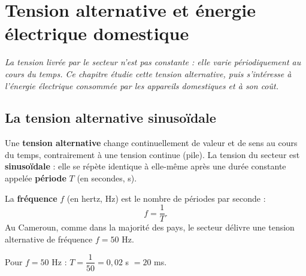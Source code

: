 \chapter{Tension alternative et énergie électrique domestique}

\noindent\textit{La tension livrée par le secteur n'est pas constante : elle varie
périodiquement au cours du temps. Ce chapitre étudie cette tension alternative, puis
s'intéresse à l'énergie électrique consommée par les appareils domestiques et à son coût.}
\vspace{8pt}

\connecteBanner

\section{La tension alternative sinusoïdale}

\begin{definition}
Une \textbf{tension alternative} change continuellement de valeur et de sens au cours du
temps, contrairement à une tension continue (pile). La tension du secteur est
\textbf{sinusoïdale} : elle se répète identique à elle-même après une durée constante
appelée \textbf{période} $T$ (en secondes, s).
\end{definition}

\begin{illus}
\end{illus}

\begin{propriete}[Fréquence]
La \textbf{fréquence} $f$ (en hertz, Hz) est le nombre de périodes par seconde :
\[
f=\frac1T.
\]
Au Cameroun, comme dans la majorité des pays, le secteur délivre une tension alternative
de fréquence $f=50$ Hz.
\end{propriete}

\begin{exemple}
Pour $f=50$ Hz : $T=\dfrac1{50}=0{,}02$ s $=20$ ms.
\end{exemple}

